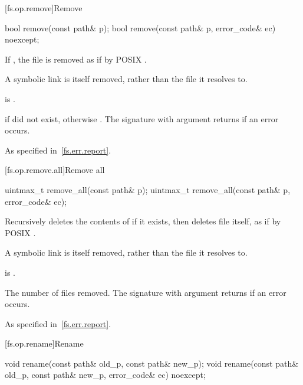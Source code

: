 [fs.op.remove]{Remove}

%
\begin{itemdecl}
bool remove(const path& p);
bool remove(const path& p, error_code& ec) noexcept;
\end{itemdecl}

\begin{itemdescr}
\pnum
\effects
If , the file  is
  removed as if by POSIX .
\begin{note}
A symbolic link is itself removed, rather than the file it
  resolves to.
\end{note}

\pnum
\ensures
{} is .

\pnum
\returns
{} if  did not exist,
  otherwise . The signature with argument 
  returns  if an error occurs.

\pnum
\throws
As specified in~\ref{fs.err.report}.
\end{itemdescr}


[fs.op.remove.all]{Remove all}

%
\begin{itemdecl}
uintmax_t remove_all(const path& p);
uintmax_t remove_all(const path& p, error_code& ec);
\end{itemdecl}

\begin{itemdescr}
\pnum
\effects
Recursively deletes the contents of  if it exists,
  then deletes file  itself, as if by POSIX .
\begin{note}
A symbolic link is itself removed, rather than the file it
  resolves to.
\end{note}

\pnum
\ensures
{} is .

\pnum
\returns
The number of files removed. The signature with argument
   returns  if an error
  occurs.

\pnum
\throws
As specified in~\ref{fs.err.report}.
\end{itemdescr}


[fs.op.rename]{Rename}

%
\begin{itemdecl}
void rename(const path& old_p, const path& new_p);
void rename(const path& old_p, const path& new_p, error_code& ec) noexcept;
\end{itemdecl}

